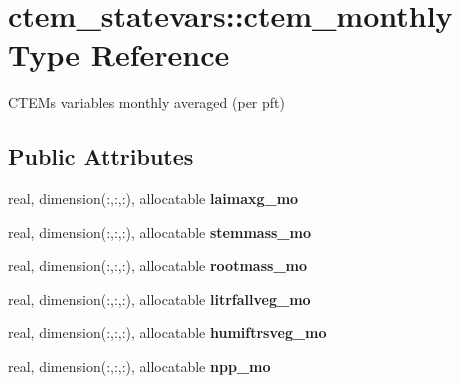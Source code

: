 \hypertarget{structctem__statevars_1_1ctem__monthly}{}\section{ctem\+\_\+statevars\+:\+:ctem\+\_\+monthly Type Reference}
\label{structctem__statevars_1_1ctem__monthly}


C\+T\+E\+M\textquotesingle{}s variables monthly averaged (per pft)  


\subsection*{Public Attributes}
\begin{DoxyCompactItemize}
\item 
\hypertarget{structctem__statevars_1_1ctem__monthly_a8b17495045786c6fb2db12647615bd12}{}real, dimension(\+:,\+:,\+:), allocatable {\bfseries laimaxg\+\_\+mo}\label{structctem__statevars_1_1ctem__monthly_a8b17495045786c6fb2db12647615bd12}

\item 
\hypertarget{structctem__statevars_1_1ctem__monthly_a5fd40a40e88e1663fd9ecae2e3c6aa75}{}real, dimension(\+:,\+:,\+:), allocatable {\bfseries stemmass\+\_\+mo}\label{structctem__statevars_1_1ctem__monthly_a5fd40a40e88e1663fd9ecae2e3c6aa75}

\item 
\hypertarget{structctem__statevars_1_1ctem__monthly_af5b4bd5e4926d39c1c69be3705fbca90}{}real, dimension(\+:,\+:,\+:), allocatable {\bfseries rootmass\+\_\+mo}\label{structctem__statevars_1_1ctem__monthly_af5b4bd5e4926d39c1c69be3705fbca90}

\item 
\hypertarget{structctem__statevars_1_1ctem__monthly_a8607257ae4d72af0f577053e8ad20ca7}{}real, dimension(\+:,\+:,\+:), allocatable {\bfseries litrfallveg\+\_\+mo}\label{structctem__statevars_1_1ctem__monthly_a8607257ae4d72af0f577053e8ad20ca7}

\item 
\hypertarget{structctem__statevars_1_1ctem__monthly_a0235de80498d649751106fc83b4821c5}{}real, dimension(\+:,\+:,\+:), allocatable {\bfseries humiftrsveg\+\_\+mo}\label{structctem__statevars_1_1ctem__monthly_a0235de80498d649751106fc83b4821c5}

\item 
\hypertarget{structctem__statevars_1_1ctem__monthly_a2e88ad2842fddc949e6162682c3a538c}{}real, dimension(\+:,\+:,\+:), allocatable {\bfseries npp\+\_\+mo}\label{structctem__statevars_1_1ctem__monthly_a2e88ad2842fddc949e6162682c3a538c}


\end{DoxyCompactItemize}
